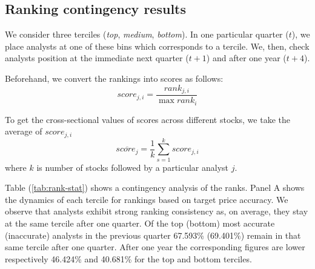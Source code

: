 \documentclass{article}\usepackage[]{graphicx}\usepackage[]{color}
\begin{document}
\subsection{Ranking contingency results}
We consider  three terciles (\textit{top}, \textit{medium}, \textit{bottom}). In one particular quarter ($t$), we place  analysts at one of these bins which corresponds to a tercile. We, then,  check analysts position at the immediate next quarter ($t+1$) and after one year ($t+4$).   

Beforehand, we convert the rankings into scores as follows:
\begin{equation}
\label{eq:score}
score_{j,i}=\frac{rank_{j,i}}{\max{rank_i}}
\end{equation}

To get the cross-sectional values of scores across different stocks, we take the average of $score_{j,i}$
\begin{equation}
\label{eq:mean-score}
\overline{score_{j}}= \frac{1}{k} \sum_{s=1}^{k} score_{j,i}
\end{equation}
where $k$ is number of stocks followed by a particular analyst $j$. 

Table (\ref{tab:rank-stat}) shows a contingency analysis of the ranks. 
Panel A shows the dynamics of each tercile for rankings based on target price  accuracy. We observe that analysts exhibit strong ranking consistency as, on average, they stay at the same tercile after one quarter. Of the top (bottom) most accurate (inaccurate) analysts in the previous quarter 67.593\% (69.401\%) remain in that same tercile after one quarter. After one year the corresponding figures are lower respectively 46.424\% and 40.681\% for the top and bottom terciles. 
\end{document}

